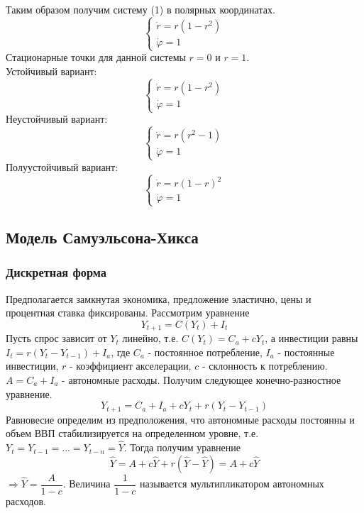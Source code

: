 Таким образом получим систему (1) в полярных координатах.
\begin{equation}
  \begin{cases}
    \dot{r}=r(1-r^2)\\
    \dot{\varphi}=1
  \end{cases}
\end{equation}
Стационарные точки для данной системы $r=0$ и $r=1$.\\
Устойчивый вариант:
\begin{equation}
  \begin{cases}
    \dot{r}=r(1-r^2)\\
    \dot{\varphi}=1
  \end{cases}
\end{equation}
Неустойчивый вариант:
\begin{equation}
  \begin{cases}
    \dot{r}=r(r^2-1)\\
    \dot{\varphi}=1
  \end{cases}
\end{equation}
Полуустойчивый вариант:
\begin{equation}
  \begin{cases}
    \dot{r}=r(1-r)^2\\
    \dot{\varphi}=1
  \end{cases}
\end{equation}
\subsection{Модель Самуэльсона-Хикса}
\subsubsection{Дискретная форма}
Предполагается замкнутая экономика, предложение эластично, цены и процентная ставка фиксированы.
Рассмотрим уравнение
\begin{equation}
  Y_{t+1}=C(Y_t)+I_t
\end{equation}
Пусть спрос зависит от $Y_t$ линейно, т.е. $C(Y_t)=C_a+cY_t$, а инвестиции равны $I_t=r(Y_t-Y_{t-1}) +I_a$, где
$C_a$ - постоянное потребление, $I_a$ - постоянные инвестиции, $r$ - коэффициент акселерации, $c$ - склонность к потреблению.
 $A=C_a+I_a$ - автономные расходы. Получим следующее конечно-разностное уравнение.
 \begin{equation}
   Y_{t+1}=C_a+I_a + cY_t + r(Y_t-Y_{t-1})
 \end{equation}
 Равновесие определим из предположения, что автономные расходы постоянны и объем ВВП стабилизируется на определенном уровне, т.е.
 $Y_t=Y_{t-1}=...=Y_{t-n}=\widehat{Y}$. Тогда получим уравнение
 \begin{equation}
   \widehat{Y}=A + c\widehat{Y} + r(\widehat{Y}-\widehat{Y})=A+c\widehat{Y}
 \end{equation}
 $\Rightarrow \widehat{Y}=\dfrac{A}{1-c}$. Величина $\dfrac{1}{1-c}$ называется мультипликатором автономных расходов.

